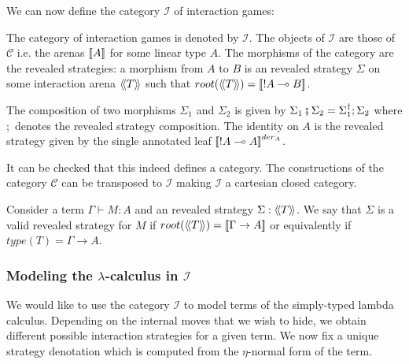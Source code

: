 We can now define the category $\mathcal{I}$ of interaction games:
\begin{dfn}
The category of interaction games is denoted by $\mathcal{I}$. The
objects of $\mathcal{I}$ are those of $\mathcal{C}$ i.e. the arenas
${[\![ A ]\!]}$ for some linear type $A$. The morphisms of the category
are the revealed strategies: a morphism from $A$ to $B$ is an
revealed strategy $\Sigma$ on some interaction arena ${\langle\!\langle T \rangle\!\rangle}$
such that $root({\langle\!\langle T \rangle\!\rangle}) = {[\![ !A\multimap B ]\!]}$.

The composition of two morphisms $\Sigma_1$ and $\Sigma_2$ is given
by $\Sigma_1 \fatsemi \Sigma_2 = \Sigma_1^\dagger ; \Sigma_2$ where
$;$ denotes the revealed strategy composition. The identity on $A$
is the revealed strategy given by the single annotated leaf ${[\![ !A
\multimap A ]\!]}^{der_A}$.
\end{dfn}

It can be checked that this indeed defines a category. The constructions of the category $\mathcal{C}$ can be transposed to $\mathcal{I}$
making $\mathcal{I}$ a cartesian closed category.


\begin{dfn}
Consider a term $\Gamma \vdash M : A$ and an revealed strategy
$\Sigma : {\langle\!\langle T \rangle\!\rangle}$. We say that $\Sigma$ is a valid revealed
strategy for $M$ if $root({\langle\!\langle T \rangle\!\rangle}) = {[\![ \Gamma \rightarrow
A ]\!]}$ or equivalently if $type(T) = \Gamma \rightarrow A$.
\end{dfn}


\subsubsection{Modeling the $\lambda$-calculus in $\mathcal{I}$}

We would like to use the category $\mathcal{I}$ to model terms of
the simply-typed lambda calculus.
Depending on the internal moves that we wish to hide, we obtain different possible interaction strategies for a given term.
We now fix a unique strategy denotation which is computed from the $\eta$-normal form of the term.

